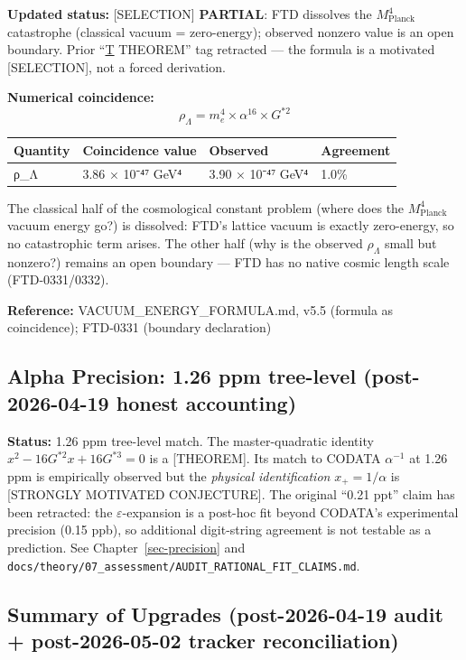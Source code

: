 \documentclass[
  11pt,
  letterpaper,
  twoside,
  openany]{book}
\makeatletter
\let\orig@subsection\subsection
\renewcommand{\subsection}{\needspace{6\baselineskip}\orig@subsection}
\makeatother
\begin{document}
\textbf{Updated status:} {[}SELECTION{]} \textbf{PARTIAL}: FTD dissolves
the \(M_\text{Planck}^4\) catastrophe (classical vacuum = zero-energy);
observed nonzero value is an open boundary. Prior ``\hyperref[t]{T}
THEOREM'' tag retracted --- the formula is a motivated {[}SELECTION{]},
not a forced derivation.

\textbf{Numerical coincidence:}
\[\rho_\Lambda = m_e^4 \times \alpha^{16} \times G^{*2}\]

\begin{longtable}[]{@{}llll@{}}
\toprule\noalign{}
Quantity & Coincidence value & Observed & Agreement \\
\midrule\noalign{}
\endhead
\bottomrule\noalign{}
\endlastfoot
ρ\_Λ & 3.86 × 10⁻⁴⁷ GeV⁴ & 3.90 × 10⁻⁴⁷ GeV⁴ & 1.0\% \\
\end{longtable}

The classical half of the cosmological constant problem (where does the
\(M_\text{Planck}^4\) vacuum energy go?) is dissolved: FTD's lattice
vacuum is exactly zero-energy, so no catastrophic term arises. The other
half (why is the observed \(\rho_\Lambda\) small but nonzero?) remains
an open boundary --- FTD has no native cosmic length scale
(FTD-0331/0332).

\textbf{Reference:} VACUUM\_ENERGY\_FORMULA.md, v5.5 (formula as
coincidence); FTD-0331 (boundary declaration)

\subsection{Alpha Precision: 1.26 ppm tree-level (post-2026-04-19 honest
accounting)}\label{alpha-precision-1.26-ppm-tree-level-post-2026-04-19-honest-accounting}

\textbf{Status:} 1.26 ppm tree-level match. The master-quadratic
identity \(x^2 - 16G^{*2}x + 16G^{*3} = 0\) is a {[}THEOREM{]}. Its
match to CODATA \(\alpha^{-1}\) at 1.26 ppm is empirically observed but
the \emph{physical identification} \(x_+ = 1/\alpha\) is {[}STRONGLY
MOTIVATED CONJECTURE{]}. The original ``0.21 ppt'' claim has been
retracted: the \(\varepsilon\)-expansion is a post-hoc fit beyond
CODATA's experimental precision (0.15 ppb), so additional digit-string
agreement is not testable as a prediction. See
Chapter~\ref{sec-precision} and
\texttt{docs/theory/07\_assessment/AUDIT\_RATIONAL\_FIT\_CLAIMS.md}.

\subsection{Summary of Upgrades (post-2026-04-19 audit + post-2026-05-02
tracker
reconciliation)}\label{summary-of-upgrades-post-2026-04-19-audit-post-2026-05-02-tracker-reconciliation}
\end{document}
